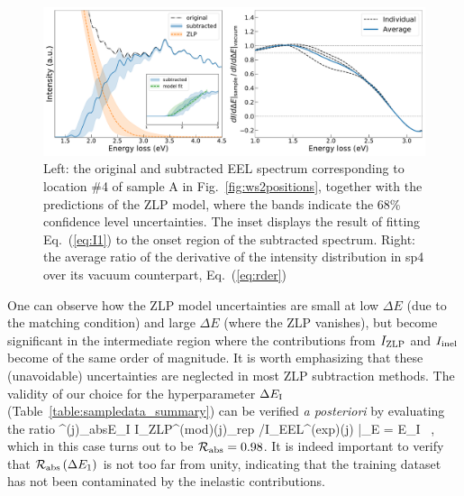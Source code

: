 \begin{figure}[t]
\begin{centering}
  \includegraphics[width=0.99\linewidth]{plots/SubtractedEELS_plot_sp14.pdf}
   \caption{Left: the original
     and subtracted EEL spectrum corresponding to location \#4 of sample A in Fig.~\ref{fig:ws2positions},
     together with the predictions of the ZLP model, where
     the bands indicate the 68\% confidence level uncertainties.
     The inset displays the result of fitting Eq.~(\ref{eq:I1}) to the onset
     region of the subtracted spectrum.
     Right: the average ratio of the derivative of the intensity
     distribution in sp4 over its vacuum counterpart, Eq.~(\ref{eq:rder})
  }
\label{fig:sp14_subtracted_spectrum}
\end{centering}
\end{figure}

One can observe how the ZLP model uncertainties are small at low $\Delta E$
(due to the matching condition) and large $\Delta E$ (where the ZLP vanishes),
but become significant in the intermediate region where the contributions
from $I_{\rm ZLP}$ and $I_{\rm inel}$ become of the same order of magnitude.
%
It is worth emphasizing that these (unavoidable) uncertainties are neglected in most
ZLP subtraction methods.
%
The validity of our choice for the hyperparameter $\Delta E_{\rm I}$ (Table~\ref{table:sampledata_summary})
can be verified {\it a posteriori} by evaluating the ratio
\be
{}^{(j)}_{\rm abs}\lp \Delta E_{\rm I}\rp \equiv 
\la I_{\rm ZLP}^{({\rm mod})(j)}\ra_{\rm rep} \Big/I_{\rm EEL}^{({\rm exp})(j)} \Big|_{\Delta E = \Delta E_{\rm I}} \, ,
\ee
which in this case turns out to be $\mathcal{R}_{\rm abs} = 0.98$.
%
It is indeed important to verify that $\mathcal{R}_{\rm abs}\left( \Delta E_1\right)$ is not too far from unity,
indicating that the training dataset has not been contaminated by the inelastic contributions.

